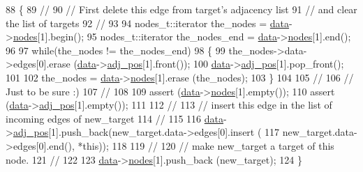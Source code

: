 \begin{DoxyCode}
88                                          \{
89     \textcolor{comment}{//}
90     \textcolor{comment}{// First delete this edge from target's adjacency list}
91     \textcolor{comment}{// and clear the list of targets}
92     \textcolor{comment}{//}
93     
94     nodes\_t::iterator the\_nodes = \mbox{\hyperlink{classedge_a0ebb6dfa28b77f47529085049352b436}{data}}->\mbox{\hyperlink{classedge__data_a870bbbb05de6c5f63d434db624c55dd4}{nodes}}[1].begin();
95     nodes\_t::iterator the\_nodes\_end = \mbox{\hyperlink{classedge_a0ebb6dfa28b77f47529085049352b436}{data}}->\mbox{\hyperlink{classedge__data_a870bbbb05de6c5f63d434db624c55dd4}{nodes}}[1].end();
96 
97     \textcolor{keywordflow}{while}(the\_nodes != the\_nodes\_end)
98     \{
99     the\_nodes->data->edges[0].erase (\mbox{\hyperlink{classedge_a0ebb6dfa28b77f47529085049352b436}{data}}->\mbox{\hyperlink{classedge__data_aa325caa449576727df8042bad875bf43}{adj\_pos}}[1].front());
100     \mbox{\hyperlink{classedge_a0ebb6dfa28b77f47529085049352b436}{data}}->\mbox{\hyperlink{classedge__data_aa325caa449576727df8042bad875bf43}{adj\_pos}}[1].pop\_front();
101     
102     the\_nodes = \mbox{\hyperlink{classedge_a0ebb6dfa28b77f47529085049352b436}{data}}->\mbox{\hyperlink{classedge__data_a870bbbb05de6c5f63d434db624c55dd4}{nodes}}[1].erase (the\_nodes);
103     \}
104 
105     \textcolor{comment}{//}
106     \textcolor{comment}{// Just to be sure :)}
107     \textcolor{comment}{// }
108 
109     assert (\mbox{\hyperlink{classedge_a0ebb6dfa28b77f47529085049352b436}{data}}->\mbox{\hyperlink{classedge__data_a870bbbb05de6c5f63d434db624c55dd4}{nodes}}[1].empty());
110     assert (\mbox{\hyperlink{classedge_a0ebb6dfa28b77f47529085049352b436}{data}}->\mbox{\hyperlink{classedge__data_aa325caa449576727df8042bad875bf43}{adj\_pos}}[1].empty());
111 
112     \textcolor{comment}{//}
113     \textcolor{comment}{// insert this edge in the list of incoming edges of new\_target }
114     \textcolor{comment}{//}
115 
116     \mbox{\hyperlink{classedge_a0ebb6dfa28b77f47529085049352b436}{data}}->\mbox{\hyperlink{classedge__data_aa325caa449576727df8042bad875bf43}{adj\_pos}}[1].push\_back(new\_target.data->edges[0].insert (
117     new\_target.data->edges[0].end(), *\textcolor{keyword}{this}));
118 
119     \textcolor{comment}{//}
120     \textcolor{comment}{// make new\_target a target of this node.}
121     \textcolor{comment}{//}
122 
123     \mbox{\hyperlink{classedge_a0ebb6dfa28b77f47529085049352b436}{data}}->\mbox{\hyperlink{classedge__data_a870bbbb05de6c5f63d434db624c55dd4}{nodes}}[1].push\_back (new\_target);
124 \}
\end{DoxyCode}
\mbox{\label{classedge_aa7635988ab396748d6081ae5d273923b}} 
